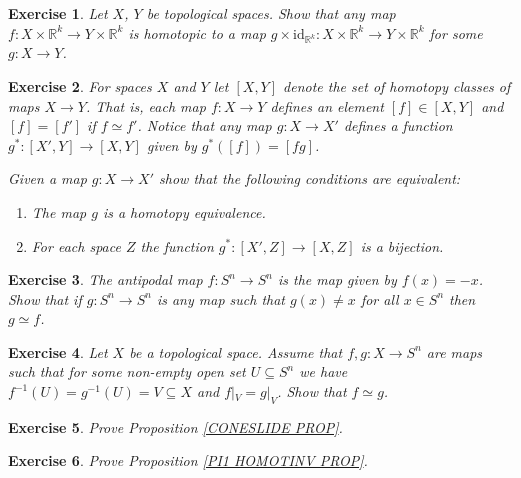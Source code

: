 \documentclass[11pt, letterpaper, oneside]{report}
\theoremstyle{pplain}
\theoremstyle{ddefinition}
\theoremstyle{nnn}
\theoremstyle{eexercise}
\newtheorem{exercise}{Exercise}[chapter]
\newcommand{\R}{{\mathbb R}}
\newcommand{\id}{\mathrm{id}}
\newcommand{\benu}{\begin{enumerate}}
\newcommand{\eenu}{\end{enumerate}}
\begin{document}
\begin{exercise}
Let $X$, $Y$ be topological spaces. Show that any map $f\colon X\times \R^{k} \to Y\times \R^{k}$
is homotopic to a map $g \times \id_{\R^{k}} \colon X \times \R^{k} \to Y\times \R^{k}$
for some $g\colon X \to Y$. 
\end{exercise}



\begin{exercise}
For spaces $X$ and $Y$ let $[X, Y]$ denote the set of homotopy classes of maps $X \to Y$. That is, each map $f\colon X \to Y$
defines an element $[f]\in [X, Y]$ and $[f] = [f']$ if $f\simeq f'$. Notice that any map $g\colon X \to X'$ defines a function 
$g^{\ast}\colon [X', Y] \to [X, Y]$ given by $g^{\ast}([f]) = [fg]$.

Given a map $g\colon X \to X'$ show that the following conditions are equivalent:

\benu
\item[1)] The map $g$ is a homotopy equivalence. 

\item[2)] For each space $Z$ the function $g^{\ast}\colon [X', Z] \to [X, Z]$ is a bijection. 
\eenu

\end{exercise}






\begin{exercise}
The antipodal map  $f\colon S^{n} \to S^{n}$ is the map given by $f(x) = -x$. 
Show that if $g\colon S^{n}\to S^{n}$ is any map such that $g(x)\neq x$
for all $x\in S^{n}$ then $g\simeq f$. 
\end{exercise}




\begin{exercise}
Let $X$ be a topological  space. Assume that $f, g \colon X \to S^{n}$ are maps such that for some 
non-empty open set $U\subseteq S^{n}$ we have $f^{-1}(U) = g^{-1}(U) = V \subseteq X$  and 
$f|_{V} = g|_{V}$. Show that $f\simeq g$.  
\end{exercise}




\begin{exercise}
Prove Proposition \ref{CONESLIDE PROP}. 
\end{exercise}

 


\begin{exercise}
Prove Proposition \ref{PI1 HOMOTINV PROP}. 
\end{exercise}
\end{document}
